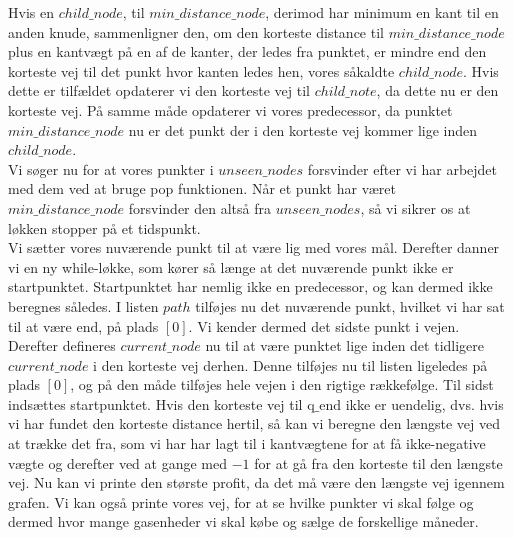 Hvis en $child\_node$, til  $min\_distance\_node$, derimod har minimum en kant til en anden knude, sammenligner den, om den korteste distance til $min\_distance\_node$ plus en kantvægt på en af de kanter, der ledes fra punktet, er mindre end den korteste vej til det punkt hvor kanten ledes hen, vores såkaldte $child\_node$. Hvis dette er tilfældet opdaterer vi den korteste vej til $child\_note$, da dette nu er den korteste vej. På samme måde opdaterer vi vores predecessor, da punktet $min\_distance\_node$ nu er det punkt der i den korteste vej kommer lige inden $child\_node$.\\
Vi søger nu for at vores punkter i $unseen\_nodes$ forsvinder efter vi har arbejdet med dem ved at bruge pop funktionen. Når et punkt har været $min\_distance\_node$ forsvinder den altså fra $unseen\_nodes$, så vi sikrer os at løkken stopper på et tidspunkt. \\
Vi sætter vores nuværende punkt til at være lig med vores mål.
Derefter danner vi en ny while-løkke, som kører så længe at det nuværende punkt ikke er startpunktet. Startpunktet har nemlig ikke en predecessor, og kan dermed ikke beregnes således. I listen $path$ tilføjes nu det nuværende punkt, hvilket vi har sat til at være $\textrm{end}$, på plads $[0]$. Vi kender dermed det sidste punkt i vejen. Derefter defineres $current\_node$ nu til at være punktet lige inden det tidligere $current\_node$ i den korteste vej derhen. Denne tilføjes nu til listen ligeledes på plads $[0]$, og på den måde tilføjes hele vejen i den rigtige rækkefølge. Til sidst indsættes startpunktet.
Hvis den korteste vej til $\textrm{q\_end}$ ikke er uendelig, dvs. hvis vi har fundet den korteste distance hertil, så kan vi beregne den længste vej ved at trække det fra, som vi har har lagt til i kantvægtene for at få ikke-negative vægte og derefter ved at gange med $-1$ for at gå fra den korteste til den længste vej. 
Nu kan vi printe den største profit, da det må være den længste vej igennem grafen. Vi kan også printe vores vej, for at se hvilke punkter vi skal følge og dermed hvor mange gasenheder vi skal købe og sælge de forskellige måneder.

